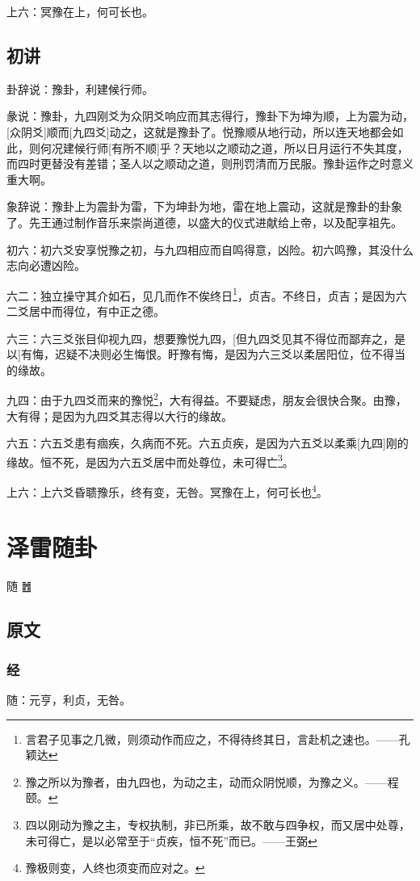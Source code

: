 \documentclass[12pt,oneside]{book}
\begin{document}
上六：冥豫在上，何可长也。

\section{初讲}
卦辞说：豫卦，利建候行师。

彖说：豫卦，九四刚爻为众阴爻响应而其志得行，豫卦下为坤为顺，上为震为动，[众阴爻]顺而[九四爻]动之，这就是豫卦了。悦豫顺从地行动，所以连天地都会如此，则何况建候行师[有所不顺]乎？天地以之顺动之道，所以日月运行不失其度，而四时更替没有差错；圣人以之顺动之道，则刑罚清而万民服。豫卦运作之时意义重大啊。

象辞说：豫卦上为震卦为雷，下为坤卦为地，雷在地上震动，这就是豫卦的卦象了。先王通过制作音乐来崇尚道德，以盛大的仪式进献给上帝，以及配享祖先。

初六：初六爻安享悦豫之初，与九四相应而自鸣得意，凶险。初六鸣豫，其没什么志向必遭凶险。

六二：独立操守其介如石，见几而作不俟终日\footnote{言君子见事之几微，则须动作而应之，不得待终其日，言赴机之速也。——孔颖达}，贞吉。不终日，贞吉；是因为六二爻居中而得位，有中正之德。

六三：六三爻张目仰视九四，想要豫悦九四，[但九四爻见其不得位而鄙弃之，是以]有悔，迟疑不决则必生悔恨。盱豫有悔，是因为六三爻以柔居阳位，位不得当的缘故。

九四：由于九四爻而来的豫悦\footnote{豫之所以为豫者，由九四也，为动之主，动而众阴悦顺，为豫之义。——程颐。}，大有得益。不要疑虑，朋友会很快合聚。由豫，大有得；是因为九四爻其志得以大行的缘故。

六五：六五爻患有痼疾，久病而不死。六五贞疾，是因为六五爻以柔乘[九四]刚的缘故。恒不死，是因为六五爻居中而处尊位，未可得亡\footnote{四以刚动为豫之主，专权执制，非已所乘，故不敢与四争权，而又居中处尊，未可得亡，是以必常至于“贞疾，恒不死”而已。——王弼}。

上六：上六爻昏聩豫乐，终有变，无咎。冥豫在上，何可长也\footnote{豫极则变，人终也须变而应对之。}。



\chapter{泽雷随卦}
随 {\Large ䷐}

\section{原文}

\subsection{经}
随：元亨，利贞，无咎。
\end{document}
